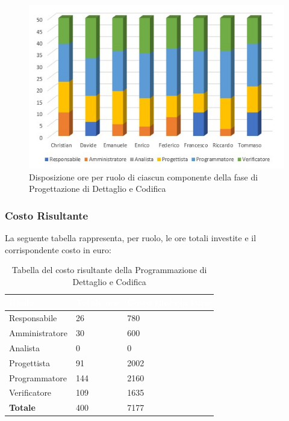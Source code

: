 \begin{figure}[h!]
\centering

\includegraphics[scale=2.5]{Sezioni/Istogrammi/IstogrammaDiDettaglio.png}
\caption{Disposizione ore per ruolo di ciascun componente della fase di Progettazione di Dettaglio e Codifica}
\end{figure}

\subsubsection{Costo Risultante}
La seguente tabella rappresenta, per ruolo, le ore totali investite e il corrispondente costo in euro:
{
\renewcommand{\arraystretch}{2}
\centering

\begin{longtable}[h]{ C{3cm} C{2cm} C{4cm}}
\caption{Tabella del costo risultante della Programmazione di Dettaglio e Codifica}\\
	\textcolor{white}{\textbf{Ruolo}} & 
	\textcolor{white}{\textbf{Totale ore}} & 
	\textcolor{white}{\textbf{Costo ruolo in euro}}\\	
\endhead
        
        Responsabile & 26 & 780 \\
        Amministratore & 30 & 600 \\
        Analista & 0 & 0 \\
        Progettista & 91 & 2002 \\
        Programmatore & 144 & 2160 \\
        Verificatore & 109 & 1635 \\
        \textbf{Totale} & 400 & 7177 \\
		
	\end{longtable}

}

